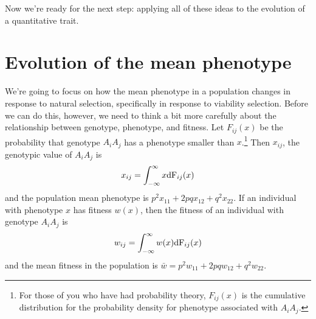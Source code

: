 \documentclass[12pt]{article}
\begin{document}
Now we're ready for the next step: applying all of these ideas to the
evolution of a quantitative trait.

\section*{Evolution of the mean phenotype}

We're going to focus on how the mean phenotype in a population changes
in response to natural selection, specifically in response to
viability selection.  Before we can do this, however, we need to think
a bit more carefully about the relationship between genotype,
phenotype, and fitness.  Let $F_{ij}(x)$ be the probability that
genotype $A_iA_j$ has a phenotype smaller than $x$.\footnote{For those
  of you who have had probability theory, $F_{ij}(x)$ is the
  cumulative distribution for the probability density for phenotype
  associated with $A_iA_j$.} Then $x_{ij}$, the genotypic value of
$A_iA_j$ is
\[
x_{ij} = \int_{-\infty}^\infty x \mbox{\rm dF}_{ij}(x)
\]
and the population mean phenotype is $p^2x_{11} + 2pqx_{12} +
q^2x_{22}$.  If an individual with phenotype $x$ has fitness $w(x)$,
then the fitness of an individual with genotype $A_iA_j$
is
\[
w_{ij} = \int_{-\infty}^\infty w(x) \mbox{\rm dF}_{ij}(x)
\]
and the mean fitness in the population is $\bar w = p^2w_{11} +
2pqw_{12} + q^2w_{22}$.
\end{document}
